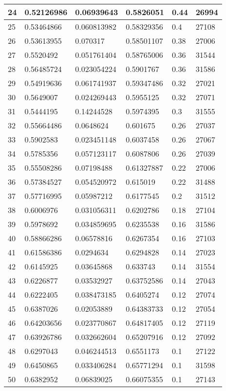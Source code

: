 \begin{longtable}{|l|l|l|l|l|l|}
24 & 0.52126986 & 0.06939643 & 0.5826051 & 0.44 & 26994 \\ \hline 
25 & 0.53464866 & 0.060813982 & 0.58329356 & 0.4 & 27108 \\ \hline 
26 & 0.53613955 & 0.070317 & 0.58501107 & 0.38 & 27006 \\ \hline 
27 & 0.5520492 & 0.051761404 & 0.58765006 & 0.36 & 31544 \\ \hline 
28 & 0.56485724 & 0.023054224 & 0.5901767 & 0.36 & 31586 \\ \hline 
29 & 0.54919636 & 0.061741937 & 0.59347486 & 0.32 & 27021 \\ \hline 
30 & 0.5649007 & 0.024269443 & 0.5955125 & 0.32 & 27071 \\ \hline 
31 & 0.5444195 & 0.14244528 & 0.5974395 & 0.3 & 31555 \\ \hline 
32 & 0.55664486 & 0.0648624 & 0.601675 & 0.26 & 27037 \\ \hline 
33 & 0.5902583 & 0.023451148 & 0.6037458 & 0.26 & 27067 \\ \hline 
34 & 0.5785356 & 0.057123117 & 0.6087806 & 0.26 & 27039 \\ \hline 
35 & 0.55508286 & 0.07198488 & 0.61327887 & 0.22 & 27006 \\ \hline 
36 & 0.57384527 & 0.054520972 & 0.615019 & 0.22 & 31488 \\ \hline 
37 & 0.57716995 & 0.05987212 & 0.6177545 & 0.2 & 31512 \\ \hline 
38 & 0.6006976 & 0.031056311 & 0.6202786 & 0.18 & 27104 \\ \hline 
39 & 0.5978692 & 0.034859695 & 0.6235538 & 0.16 & 31586 \\ \hline 
40 & 0.58866286 & 0.06578816 & 0.6267354 & 0.16 & 27103 \\ \hline 
41 & 0.61586386 & 0.0294634 & 0.6294828 & 0.14 & 27023 \\ \hline 
42 & 0.6145925 & 0.03645868 & 0.633743 & 0.14 & 31554 \\ \hline 
43 & 0.6226877 & 0.03532927 & 0.63752586 & 0.14 & 27043 \\ \hline 
44 & 0.6222405 & 0.038473185 & 0.6405274 & 0.12 & 27074 \\ \hline 
45 & 0.6387026 & 0.02053889 & 0.64383733 & 0.12 & 27054 \\ \hline 
46 & 0.64203656 & 0.023770867 & 0.64817405 & 0.12 & 27119 \\ \hline 
47 & 0.63926786 & 0.032662604 & 0.65207916 & 0.12 & 27092 \\ \hline 
48 & 0.6297043 & 0.046244513 & 0.6551173 & 0.1 & 27122 \\ \hline 
49 & 0.6450865 & 0.033406284 & 0.65771294 & 0.1 & 31598 \\ \hline 
50 & 0.6382952 & 0.06839025 & 0.66075355 & 0.1 & 27143 \\ \hline 
\end{longtable}